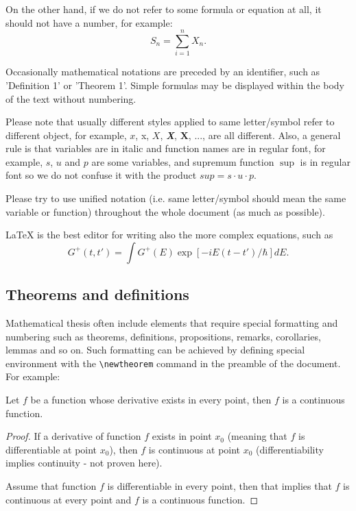 On the other hand, if we do not refer to some formula or equation at all, it should not have a number, for example:
\[
S_n=\sum_{i=1}^n X_n.
\]

Occasionally mathematical notations are preceded by an
identifier, such as 'Definition 1' or 'Theorem 1'. Simple formulas may 
be displayed within the body of the text without numbering.

Please note that usually different styles applied to same letter/symbol refer to different object, for example, $x$, x, $X$, \textit{\textbf{X}}, $\mathbf{X}$, ..., are all different. Also, a general rule is that variables are in italic and function names are in regular font, for example, $s$, $u$ and $p$ are some variables, and supremum function $\sup$ is in regular font so we do not confuse it with the product $sup=s\cdot u\cdot p$. 

Please try to use unified notation (i.e. same letter/symbol should mean the same variable or function) throughout the whole document (as much as possible).


LaTeX is the best editor for writing also the more complex equations, such as
\begin{equation}
  \label{eq:fourier}
  G^+(t,t')= \int G^+(E) \exp[-iE(t-t')/\hbar] dE.
\end{equation}

\subsection{Theorems and definitions}

Mathematical thesis often include elements that require special formatting and numbering such as theorems, definitions, propositions, remarks, corollaries, lemmas and so on. Such formatting can be achieved by defining special environment with the \verb+\newtheorem+ command in the preamble of the document. For example:

\begin{theorem}
Let $f$ be a function whose derivative exists in every point, then $f$ is 
a continuous function.
\end{theorem}

\begin{proof}
If a derivative of function $f$ exists in point $x_0$ (meaning that $f$ is differentiable at point $x_0$), then $f$ is continuous at point $x_0$ (differentiability implies continuity - not proven here). 

Assume that function $f$ is differentiable in every point, then that implies that $f$ is continuous at every point and $f$ is a continuous function.
\end{proof}

